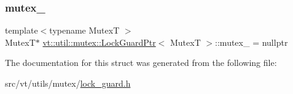 \subsubsection{\texorpdfstring{mutex\+\_\+}{mutex\_}}
{\footnotesize\ttfamily template$<$typename MutexT $>$ \\
MutexT$\ast$ \hyperlink{structvt_1_1util_1_1mutex_1_1_lock_guard_ptr}{vt\+::util\+::mutex\+::\+Lock\+Guard\+Ptr}$<$ MutexT $>$\+::mutex\+\_\+ = nullptr\hspace{0.3cm}{\ttfamily [private]}}



The documentation for this struct was generated from the following file\+:\begin{DoxyCompactItemize}
\item 
src/vt/utils/mutex/\hyperlink{lock__guard_8h}{lock\+\_\+guard.\+h}\end{DoxyCompactItemize}
